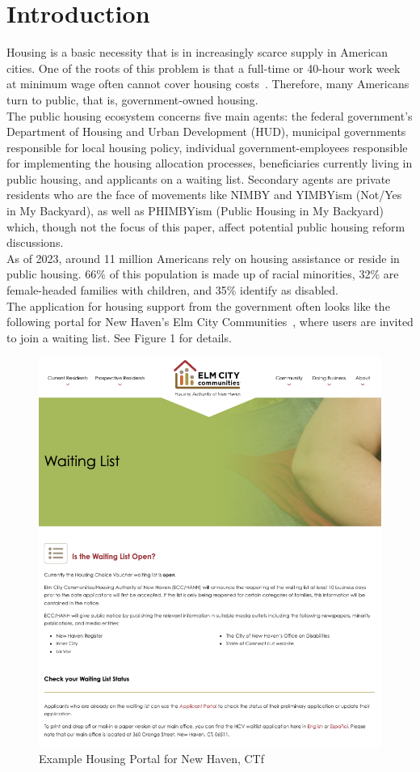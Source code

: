 \documentclass[11pt]{article}
\begin{document}
\section{Introduction}
Housing is a basic necessity that is in increasingly scarce supply in American cities. One of the roots of this problem is that a full-time or 40-hour work week at minimum wage often cannot cover housing costs~\cite{nlihc_out_2019}. Therefore, many Americans turn to public, that is, government-owned housing. \\
\newline
The public housing ecosystem concerns five main agents: the federal government’s Department of Housing and Urban Development (HUD), municipal governments responsible for local housing policy, individual government-employees  responsible for implementing the housing allocation processes, beneficiaries currently living in public housing, and applicants on a waiting list. Secondary agents are private residents who are the face of movements like NIMBY and YIMBYism (Not/Yes in My Backyard), as well as PHIMBYism (Public Housing in My Backyard) which, though not the focus of this paper, affect potential public housing reform discussions. \\
\newline
As of 2023, around 11 million Americans rely on housing assistance or reside in public housing. 66\% of this population is made up of racial minorities, 32\% are female-headed families with children, and 35\% identify as disabled. \\
\newline
The application for housing support from the government often looks like the following portal for New Haven’s Elm City Communities~\cite{elm_city_communities_public_nodate}, where users are invited to join a waiting list. See Figure 1 for details.
\newline
\begin{figure}
    \centering
    \includegraphics[width=0.75\linewidth]{elm.png}
    \caption{Example Housing Portal for New Haven, CTf}
\end{figure}
\end{document}
